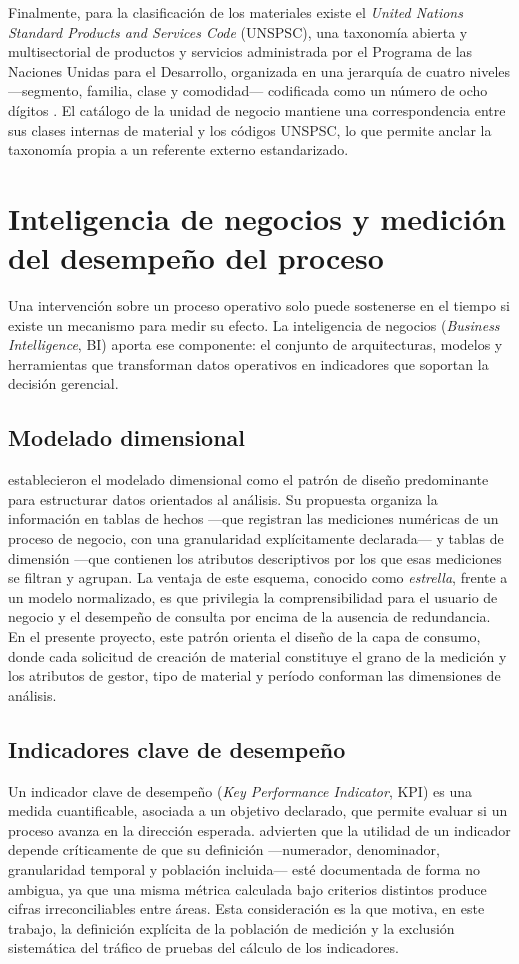 Finalmente, para la clasificación de los materiales existe el \textit{United Nations Standard Products and Services Code} (UNSPSC), una taxonomía abierta y multisectorial de productos y servicios administrada por el Programa de las Naciones Unidas para el Desarrollo, organizada en una jerarquía de cuatro niveles —segmento, familia, clase y comodidad— codificada como un número de ocho dígitos \cite{undp2023}. El catálogo de la unidad de negocio mantiene una correspondencia entre sus clases internas de material y los códigos UNSPSC, lo que permite anclar la taxonomía propia a un referente externo estandarizado.

\section{Inteligencia de negocios y medición del desempeño del proceso}
Una intervención sobre un proceso operativo solo puede sostenerse en el tiempo si existe un mecanismo para medir su efecto. La inteligencia de negocios (\textit{Business Intelligence}, BI) aporta ese componente: el conjunto de arquitecturas, modelos y herramientas que transforman datos operativos en indicadores que soportan la decisión gerencial.

\subsection{Modelado dimensional}
 establecieron el modelado dimensional como el patrón de diseño predominante para estructurar datos orientados al análisis. Su propuesta organiza la información en tablas de hechos —que registran las mediciones numéricas de un proceso de negocio, con una granularidad explícitamente declarada— y tablas de dimensión —que contienen los atributos descriptivos por los que esas mediciones se filtran y agrupan. La ventaja de este esquema, conocido como \textit{estrella}, frente a un modelo normalizado, es que privilegia la comprensibilidad para el usuario de negocio y el desempeño de consulta por encima de la ausencia de redundancia. En el presente proyecto, este patrón orienta el diseño de la capa de consumo, donde cada solicitud de creación de material constituye el grano de la medición y los atributos de gestor, tipo de material y período conforman las dimensiones de análisis.

\subsection{Indicadores clave de desempeño}
Un indicador clave de desempeño (\textit{Key Performance Indicator}, KPI) es una medida cuantificable, asociada a un objetivo declarado, que permite evaluar si un proceso avanza en la dirección esperada.  advierten que la utilidad de un indicador depende críticamente de que su definición —numerador, denominador, granularidad temporal y población incluida— esté documentada de forma no ambigua, ya que una misma métrica calculada bajo criterios distintos produce cifras irreconciliables entre áreas. Esta consideración es la que motiva, en este trabajo, la definición explícita de la población de medición y la exclusión sistemática del tráfico de pruebas del cálculo de los indicadores.

